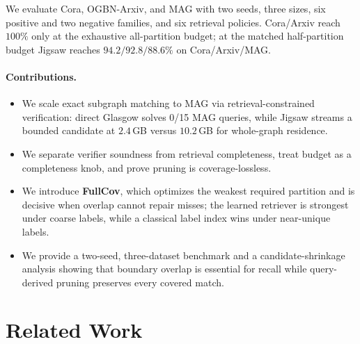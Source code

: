 \documentclass[runningheads]{llncs}
\begin{document}
We evaluate Cora, OGBN-Arxiv, and MAG with two seeds, three sizes, six positive and two negative families, and six retrieval policies. Cora/Arxiv reach $100\%$ only at the exhaustive all-partition budget; at the matched half-partition budget Jigsaw reaches $94.2/92.8/88.6\%$ on Cora/Arxiv/MAG.

\paragraph{Contributions.}
\begin{itemize}
    \item We scale exact subgraph matching to MAG via retrieval-constrained verification: direct Glasgow solves 0/15 MAG queries, while Jigsaw streams a bounded candidate at $2.4$\,GB versus $10.2$\,GB for whole-graph residence.
    \item We separate verifier soundness from retrieval completeness, treat budget as a completeness knob, and prove pruning is coverage-lossless.
    \item We introduce \textbf{FullCov}, which optimizes the weakest required partition and is decisive when overlap cannot repair misses; the learned retriever is strongest under coarse labels, while a classical label index wins under near-unique labels.
    \item We provide a two-seed, three-dataset benchmark and a candidate-shrinkage analysis showing that boundary overlap is essential for recall while query-derived pruning preserves every covered match.
\end{itemize}

\section{Related Work}
\end{document}
